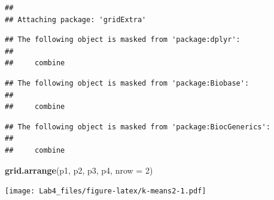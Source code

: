 \documentclass[
]{article}
\newenvironment{Shaded}{\begin{snugshade}}{\end{snugshade}}
\newcommand{\CommentTok}[1]{\textcolor[rgb]{0.56,0.35,0.01}{\textit{#1}}}
\newcommand{\ControlFlowTok}[1]{\textcolor[rgb]{0.13,0.29,0.53}{\textbf{#1}}}
\newcommand{\DataTypeTok}[1]{\textcolor[rgb]{0.13,0.29,0.53}{#1}}
\newcommand{\DecValTok}[1]{\textcolor[rgb]{0.00,0.00,0.81}{#1}}
\newcommand{\KeywordTok}[1]{\textcolor[rgb]{0.13,0.29,0.53}{\textbf{#1}}}
\newcommand{\NormalTok}[1]{#1}
\newcommand{\OperatorTok}[1]{\textcolor[rgb]{0.81,0.36,0.00}{\textbf{#1}}}
\newcommand{\OtherTok}[1]{\textcolor[rgb]{0.56,0.35,0.01}{#1}}
\newcommand{\StringTok}[1]{\textcolor[rgb]{0.31,0.60,0.02}{#1}}
\begin{document}
\begin{verbatim}
## 
## Attaching package: 'gridExtra'
\end{verbatim}

\begin{verbatim}
## The following object is masked from 'package:dplyr':
## 
##     combine
\end{verbatim}

\begin{verbatim}
## The following object is masked from 'package:Biobase':
## 
##     combine
\end{verbatim}

\begin{verbatim}
## The following object is masked from 'package:BiocGenerics':
## 
##     combine
\end{verbatim}

\begin{Shaded}
\begin{Highlighting}[]
\KeywordTok{grid.arrange}\NormalTok{(p1, p2, p3, p4, }\DataTypeTok{nrow =} \DecValTok{2}\NormalTok{)}
\end{Highlighting}
\end{Shaded}

\texttt{[image: Lab4\_files/figure-latex/k-means2-1.pdf]}

\begin{Shaded}
\end{Shaded}
\end{document}
